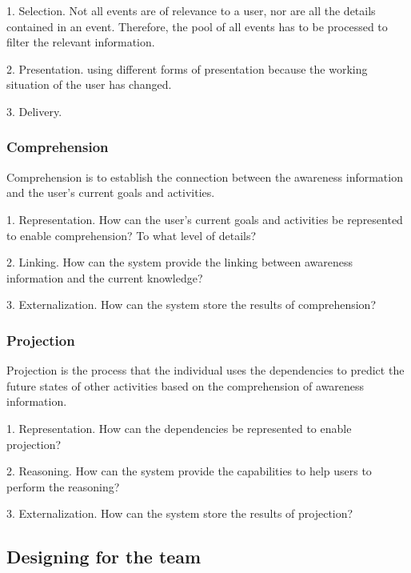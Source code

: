 1. Selection.  Not all events are of relevance to a user, nor are all the details contained in an event. Therefore, the pool of all events has to be processed to filter the relevant information. \cite{Berlage1999}

2. Presentation. using different forms of presentation because the working situation of the user has changed. \cite{Berlage1999}

3. Delivery. \cite{Iqbal2010}


\subsubsection*{Comprehension} %
\label{ssub:comprehension}
Comprehension is to establish the connection between the awareness information and the user's current goals and activities. \cite{oulasvirta2007a}

1. Representation. How can the user's current goals and activities be represented to enable comprehension? To what level of details?

2. Linking. How can the system provide the linking between awareness information and the current knowledge?

3. Externalization. How can the system store the results of comprehension?

\subsubsection*{Projection} %
\label{ssub:projection}
Projection is the process that the individual uses the dependencies to predict the future states of other activities based on the comprehension of awareness information.

1. Representation. How can the dependencies be represented to enable projection? 

2. Reasoning. How can the system provide the capabilities to help users to perform the reasoning?

3. Externalization. How can the system store the results of projection?


\subsection{Designing for the team} %
\label{sub:designing_for_the_team}

